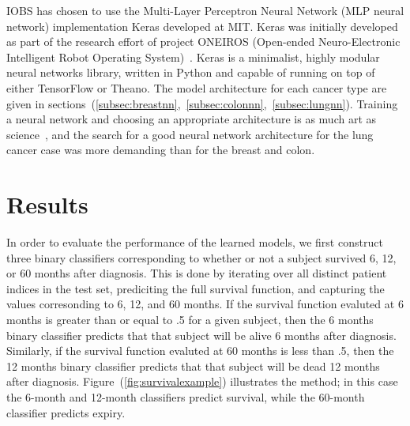 \documentclass[a4paper,11pt]{article}
\begin{document}
IOBS has chosen to use the Multi-Layer Perceptron Neural Network (MLP neural network) implementation Keras developed at MIT.
Keras was initially developed as part of the research effort of project ONEIROS (Open-ended Neuro-Electronic Intelligent Robot Operating System)~\cite{keras}.
Keras is a minimalist, highly modular neural networks library, written in Python and capable of running on top of either TensorFlow or Theano. The model architecture for each cancer type are given in sections~(\ref{subsec:breastnn},~\ref{subsec:colonnn},~\ref{subsec:lungnn}). Training a neural network and choosing an appropriate architecture is as much art as science~\cite{deeplearning}, and the search for a good neural network architecture for the lung cancer case was more demanding than for the breast and colon. 




















\section{Results}
\label{sec:results}


In order to evaluate the performance of the learned models, we first construct three binary classifiers corresponding to whether or not a subject survived 6, 12, or 60 months after diagnosis. 
This is done by iterating over all distinct patient indices in the test set, prediciting the full survival function, and capturing the values corresonding to 6, 12, and 60 months.  
If the survival function evaluted at 6 months is greater than or equal to .5 for a given subject, then the 6 months binary classifier predicts that that subject will be alive 6 months after diagnosis. Similarly, if the survival function evaluted at 60 months is less than .5, then the 12 months binary classifier predicts that that subject will be dead 12 months after diagnosis. Figure~(\ref{fig:survivalexample}) illustrates the method; in this case the 6-month and 12-month classifiers predict survival, while the 60-month classifier predicts expiry.
\end{document}
